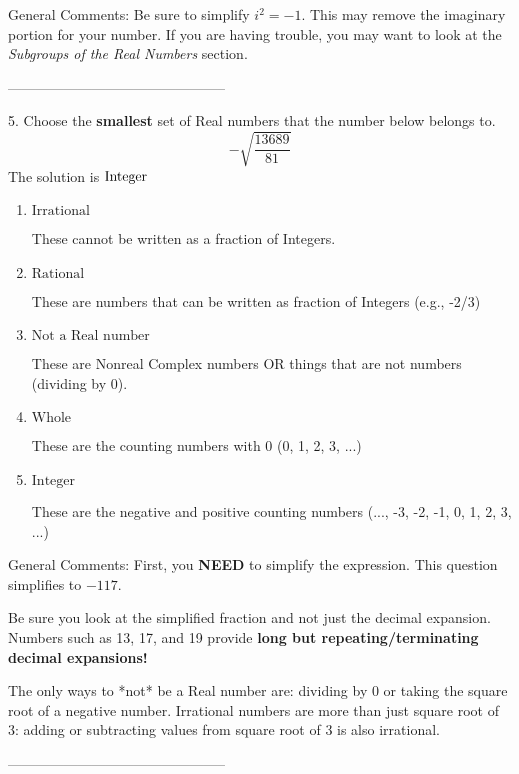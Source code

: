 \documentclass{article}[14pt]
\begin{document}
General Comments: Be sure to simplify $i^2 = -1$. This may remove the imaginary portion for your number. If you are having trouble, you may want to look at the \textit{Subgroups of the Real Numbers} section.

-----------------------------------------------

5. Choose the \textbf{smallest} set of Real numbers that the number below belongs to.
$$ -\sqrt{\frac{13689}{81}} $$ 
The solution is $ \text{\text{Integer}} $ 

\begin{enumerate}[label=\Alph*.] 
\item $ \text{Irrational} $ 

 These cannot be written as a fraction of Integers. 
\item $ \text{Rational} $ 

 These are numbers that can be written as fraction of Integers (e.g., -2/3) 
\item $ \text{Not a Real number} $ 

 These are Nonreal Complex numbers OR things that are not numbers (dividing by 0). 
\item $ \text{Whole} $ 

 These are the counting numbers with 0 (0, 1, 2, 3, ...) 
\item $ \text{Integer} $ 

 These are the negative and positive counting numbers (..., -3, -2, -1, 0, 1, 2, 3, ...) 
\end{enumerate} 
 
General Comments: First, you \textbf{NEED} to simplify the expression. This question simplifies to $-117$. 
 
 Be sure you look at the simplified fraction and not just the decimal expansion. Numbers such as 13, 17, and 19 provide \textbf{long but repeating/terminating decimal expansions!} 
 
 The only ways to *not* be a Real number are: dividing by 0 or taking the square root of a negative number. Irrational numbers are more than just square root of 3: adding or subtracting values from square root of 3 is also irrational.

-----------------------------------------------
\end{document}
